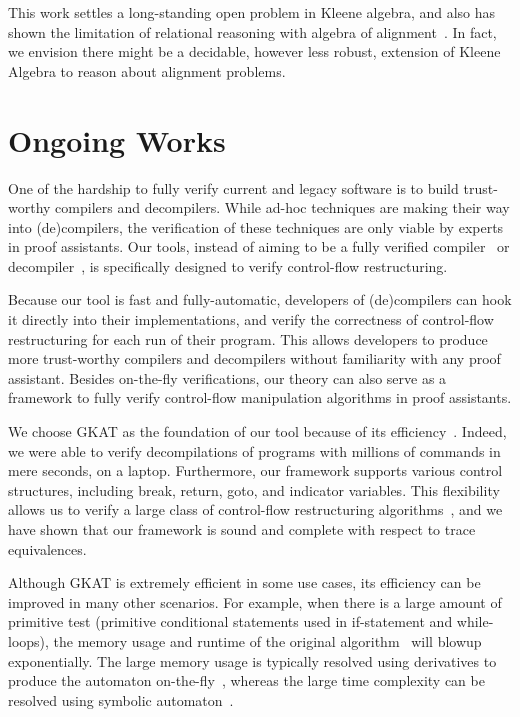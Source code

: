 \documentclass[11pt,a4paper,sans]{moderncv} %
\begin{document}
This work settles a long-standing open problem in Kleene algebra, and also has shown the limitation of relational reasoning with algebra of alignment~\cite{antonopoulos_AlgebraAlignmentRelational_2023}. In fact, we envision there might be a decidable, however less robust, extension of Kleene Algebra to reason about alignment problems.

\section{Ongoing Works}


One of the hardship to fully verify current and legacy software is to build trust-worthy compilers and decompilers. 
While ad-hoc techniques are making their way into (de)compilers, the verification of these techniques are only viable by experts in proof assistants.
Our tools, instead of aiming to be a fully verified compiler~\cite{leroy_FormalVerificationRealistic_2009} or decompiler~\cite{verbeek_FormallyVerifiedLifting_2022}, is specifically designed to verify control-flow restructuring. 

Because our tool is fast and fully-automatic, developers of (de)compilers can hook it directly into their implementations, and verify the correctness of control-flow restructuring for each run of their program. 
This allows developers to produce more trust-worthy compilers and decompilers without familiarity with any proof assistant. 
Besides on-the-fly verifications, our theory can also serve as a framework to fully verify control-flow manipulation algorithms in proof assistants.

We choose GKAT as the foundation of our tool because of its efficiency~\cite{smolka_GuardedKleeneAlgebra_2020}. Indeed, we were able to verify decompilations of programs with millions of commands in mere seconds, on a laptop. Furthermore, our framework supports various control structures, including break, return, goto, and indicator variables. This flexibility allows us to verify a large class of control-flow restructuring algorithms~\cite{yakdan_NoMoreGotos_2015,basque_AhoySAILRThere_,erosa_TamingControlFlow_1994,kozen_CertificationCompilerOptimizations_2000a}, and we have shown that our framework is sound and complete with respect to trace equivalences.


Although GKAT is extremely efficient in some use cases, its efficiency can be improved in many other scenarios. 
For example, when there is a large amount of primitive test (primitive conditional statements used in if-statement and while-loops), the memory usage and runtime of the original algorithm~\cite{smolka_GuardedKleeneAlgebra_2020} will blowup exponentially. 
The large memory usage is typically resolved using derivatives to produce the automaton on-the-fly~\cite{brzozowski_DerivativesRegularExpressions_1964, schmid_GuardedKleeneAlgebra_2021}, whereas the large time complexity can be resolved using symbolic automaton~\cite{pous_SymbolicAlgorithmsLanguage_2015}. 
\end{document}
